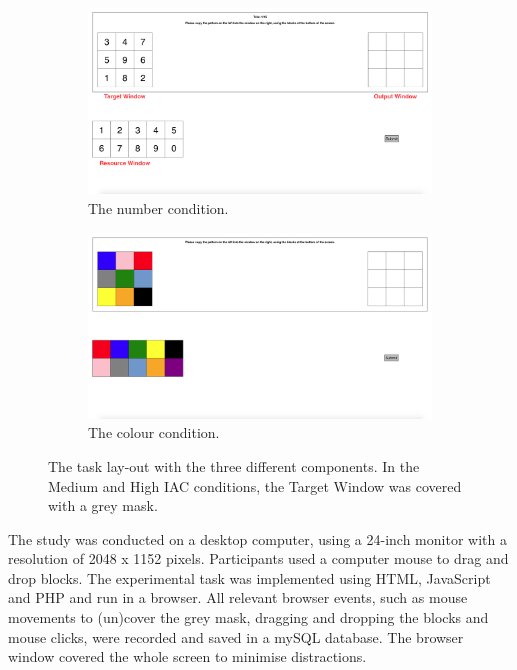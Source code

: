 \begin{figure}[]
\begin{center}

\begin{subfigure}[b]{\textwidth}
\centerline{\includegraphics[scale=0.23]{images/ch34/ch4_numbers.png}}
\caption{The number condition.}
\label{fig:ch4_BWT}
\end{subfigure}
\begin{subfigure}[b]{0.5\textwidth}
\centerline{\includegraphics[scale=0.23]{images/ch34/ch4_colours.png}}
\caption{The colour condition.}
\label{fig:ch4_NWT}
\end{subfigure}
\caption[Study 3 task lay-out]{The task lay-out with the three different components. In the Medium and High IAC conditions, the Target Window was covered with a grey mask.}
\label{fig:ch4_taskparadigm}
\end{center}
\end{figure}

The study was conducted on a desktop computer, using a 24-inch monitor with a resolution of 2048 x 1152 pixels. Participants used a computer mouse to drag and drop blocks. The experimental task was implemented using HTML, JavaScript and PHP and run in a browser.  All relevant browser events, such as mouse movements to (un)cover the grey mask, dragging and dropping the blocks and mouse clicks, were recorded and saved in a mySQL database. The browser window covered the whole screen to minimise distractions.

